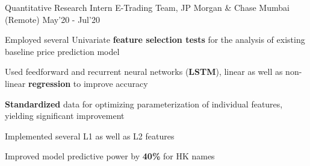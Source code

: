 \begin{cventries}

  \cventry
  {Quantitative Research Intern}
  {E-Trading Team, JP Morgan \& Chase}
  {Mumbai (Remote)}
  {May'20 - Jul'20}
  {
    \begin{cvitems}
      \item Employed several Univariate \textbf{feature selection tests} for the analysis of existing baseline price prediction model
      \item Used feedforward and recurrent neural networks (\textbf{LSTM}), linear as well as non-linear \textbf{regression} to improve accuracy
      \item	\textbf{Standardized} data for optimizing parameterization of individual features, yielding significant improvement
      \item Implemented several L1 as well as L2 features
      \item Improved model predictive power by \textbf{40\%} for HK names
    \end{cvitems}
  }
\end{cventries}
\vspace{-2mm}

